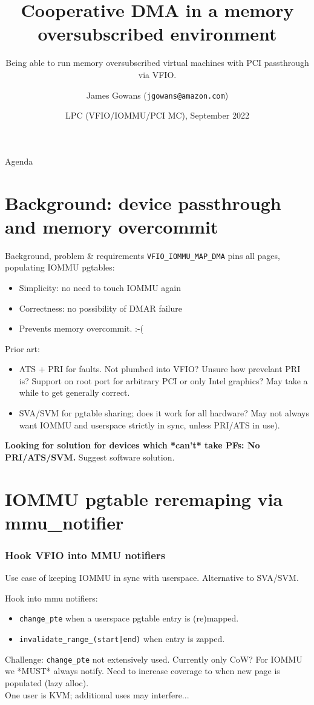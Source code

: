 \documentclass{beamer}
\title{Cooperative DMA in a memory oversubscribed environment}
\subtitle{Being able to run memory oversubscribed virtual machines with PCI passthrough via VFIO.}
\author[James Gowans (EC2) ]{James Gowans (\texttt{jgowans@amazon.com})}
\institute{Amazon / AWS / EC2}
\date{LPC (VFIO/IOMMU/PCI MC), September 2022}
\begin{document}
\begin{frame}
\titlepage
\end{frame}


\begin{frame}{Agenda}
  \tableofcontents[hideallsubsections]
\end{frame}


\section{Background: device passthrough and memory overcommit}
\begin{frame}{Background, problem \& requirements}
  \texttt{VFIO\_IOMMU\_MAP\_DMA} pins all pages, populating IOMMU pgtables:
  \begin{itemize}
    \item Simplicity: no need to touch IOMMU again
    \item Correctness: no possibility of DMAR failure
    \item Prevents memory overcommit. :-(
  \end{itemize}
  Prior art:
  \begin{itemize}
    \item ATS + PRI for faults. Not plumbed into VFIO? Unsure how prevelant PRI is? Support on root port for arbitrary PCI or only Intel graphics? May take a while to get generally correct.
    \item SVA/SVM for pgtable sharing; does it work for all hardware? May not always want IOMMU and userspace strictly in sync, unless PRI/ATS in use).
  \end{itemize}
  \textbf{Looking for solution for devices which *can't* take PFs: No PRI/ATS/SVM.}
  Suggest software solution.
\end{frame}

\section{IOMMU pgtable reremaping via mmu\_notifier}
\begin{frame}[fragile]
  \frametitle{Hook VFIO into MMU notifiers}
  Use case of keeping IOMMU in sync with userspace. Alternative to SVA/SVM.

  Hook into mmu notifiers:
  \begin{itemize}
    \item \texttt{change\_pte} when a userspace pgtable entry is (re)mapped.
    \item \texttt{invalidate\_range\_(start|end)} when entry is zapped.
  \end{itemize}

  Challenge: \texttt{change\_pte} not extensively used. Currently only CoW? For IOMMU we *MUST* always notify. Need to increase coverage to when new page is populated (lazy alloc).\\
  
  One user is KVM; additional uses may interfere...
\end{frame}
\end{document}
